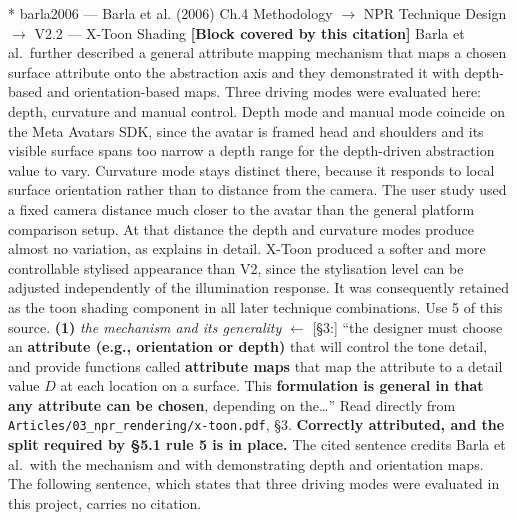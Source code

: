 \documentclass[11pt, a4paper]{article}
\makeatletter
\newcounter{citentry}
\newcommand{\citentry@core}[7]{%
  \stepcounter{citentry}
  \begingroup
  \sbox{\citentry@measurebox}{%
    \begin{minipage}{\linewidth}
      \noindent\colorbox{konstanzblue}{\parbox{\dimexpr\linewidth-2\fboxsep}{%
        \vspace{3pt}
        \textbf{\#\thecitentry \quad #2} \hfill \textit{#3}
        \vspace{3pt}
      }}
      \vspace{3pt}
      \noindent\begin{tabular}{@{}p{2.7cm} p{\dimexpr\linewidth-3cm}@{}}
        \textit{\small Sentence in thesis:} & #4 \\[5pt]
        \textbf{Usage:}\hfill       & #5 \\[5pt]
        \textit{\small Original source:}     & #6 \\[5pt]
        \textbf{How to check:}             & #7 \\
      \end{tabular}
      \vspace{5pt}
      \rule{10pt}{10pt}\quad \textbf{Validated} --- I have read the original and agree it supports the sentence.
    \end{minipage}%
  }%
  \Needspace{\dimexpr\ht\citentry@measurebox+\dp\citentry@measurebox\relax}%
  \endgroup
  \vspace{10pt}
  \noindent\colorbox{konstanzblue}{\parbox{\dimexpr\linewidth-2\fboxsep}{%
    \vspace{3pt}
    \textcolor{white}{\textbf{\#\thecitentry \quad #2}} \hfill \textcolor{white}{\textit{#3}}
    \vspace{3pt}
  }}
  \vspace{3pt}
  \noindent\begin{tabular}{@{}p{2.7cm} p{\dimexpr\linewidth-3cm}@{}}
    \textit{\small Sentence in thesis:} & \textcolor{darkgreen}{#4} \\[5pt]
    \textbf{Usage:}\hfill       & #5 \\[5pt]
    \textit{\small Original source:}     & \textcolor{darkred}{#6} \\[5pt]
    \textbf{How to check:}             & #7 \\
  \end{tabular}
  \vspace{5pt}
  \noindent\CheckBox[name=verified\thecitentry, width=10pt, height=10pt, bordercolor={0 0 0}, borderwidth=0.75, backgroundcolor={1 1 1}#1]{}\quad \textbf{Validated} --- I have read the original and agree it supports the sentence.
  \vspace{3pt}
  \noindent\textcolor{midgray}{\rule{\linewidth}{0.4pt}}
}
\newcommand{\citentry}{\@ifstar{\citentry@core{, checked}}{\citentry@core{}}}
\makeatother
\begin{document}
\begin{Form}
\citentry*
  {barla2006 --- Barla et al. (2006)}
  {Ch.4 Methodology $\rightarrow$ NPR Technique Design $\rightarrow$ V2.2 — X-Toon Shading}
  {\textbf{[Block covered by this citation]} Barla et al.\ further described a general attribute mapping mechanism that maps a chosen surface attribute onto the abstraction axis and they demonstrated it with depth-based and orientation-based maps. Three driving modes were evaluated here: depth, curvature and manual control. Depth mode and manual mode coincide on the Meta Avatars SDK, since the avatar is framed head and shoulders and its visible surface spans too narrow a depth range for the depth-driven abstraction value to vary. Curvature mode stays distinct there, because it responds to local surface orientation rather than to distance from the camera. The user study used a fixed camera distance much closer to the avatar than the general platform comparison setup. At that distance the depth and curvature modes produce almost no variation, as explains in detail. X-Toon produced a softer and more controllable stylised appearance than V2, since the stylisation level can be adjusted independently of the illumination response. It was consequently retained as the toon shading component in all later technique combinations.}
  {Use 5 of this source.}
  {\textbf{(1)} \emph{the mechanism and its generality} $\leftarrow$ [\S3:] ``the designer must choose an \textbf{attribute (e.g., orientation or depth)} that will control the tone detail, and provide functions called \textbf{attribute maps} that map the attribute to a detail value $D$ at each location on a surface. This \textbf{formulation is general in that any attribute can be chosen}, depending on the\ldots''}
  {Read directly from \texttt{\footnotesize Articles/03\_npr\_rendering/x-toon.pdf}, \S3. \textbf{Correctly attributed, and the split required by \S5.1 rule 5 is in place.} The cited sentence credits Barla et al.\ with the mechanism and with demonstrating depth and orientation maps. The following sentence, which states that three driving modes were evaluated in this project, carries no citation.}


\end{Form}
\end{document}
